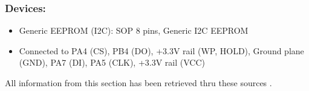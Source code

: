     \subsubsection{Devices:}
    \begin{itemize}
        \item Generic EEPROM (I2C): SOP 8 pins, Generic I2C EEPROM
        \item Connected to PA4 (CS), PB4 (DO), +3.3V rail (WP, HOLD), Ground plane (GND), PA7 (DI), PA5 (CLK), +3.3V rail (VCC)
    \end{itemize}

All information from this section has been retrieved thru these sources \cite{stm32datasheet,stm32base,stmicro}.